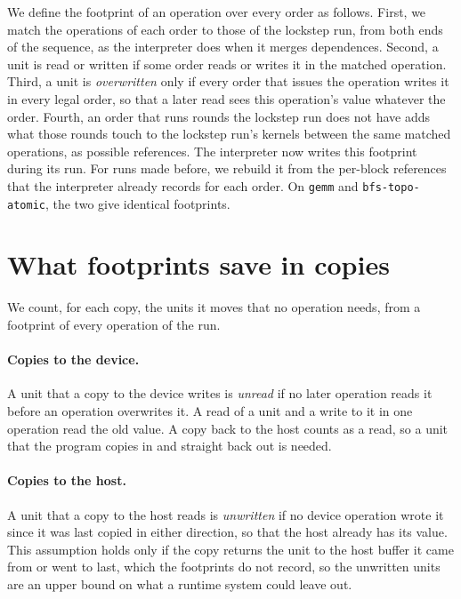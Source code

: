 \documentclass[11pt]{article}
\newcommand{\term}[1]{\emph{#1}}
\newcommand{\code}[1]{\texttt{#1}}
\begin{document}
We define the footprint of an operation over every order as follows. First, we match the operations of each order
to those of the lockstep run, from both ends of the sequence, as the interpreter does when it merges dependences.
Second, a unit is read or written if some order reads or writes it in the matched operation. Third, a unit is
\term{overwritten} only if every order that issues the operation writes it in every legal order, so that a later
read sees this operation's value whatever the order. Fourth, an order that runs rounds the lockstep run does not
have adds what those rounds touch to the lockstep run's kernels between the same matched operations, as possible
references. The interpreter now writes this footprint during its run. For runs made before, we rebuild it from the
per-block references that the interpreter already records for each order. On \code{gemm} and
\code{bfs-topo-atomic}, the two give identical footprints.

\section{What footprints save in copies}
\label{sec:copies}

We count, for each copy, the units it moves that no operation needs, from a footprint of every operation of the run.

\paragraph{Copies to the device.} A unit that a copy to the device writes is \term{unread} if no later operation
reads it before an operation overwrites it. A read of a unit and a write to it in one operation read the old value.
A copy back to the host counts as a read, so a unit that the program copies in and straight back out is needed.

\paragraph{Copies to the host.} A unit that a copy to the host reads is \term{unwritten} if no device operation
wrote it since it was last copied in either direction, so that the host already has its value. This assumption
holds only if the copy returns the unit to the host buffer it came from or went to last, which the footprints do
not record, so the unwritten units are an upper bound on what a runtime system could leave out.
\end{document}
